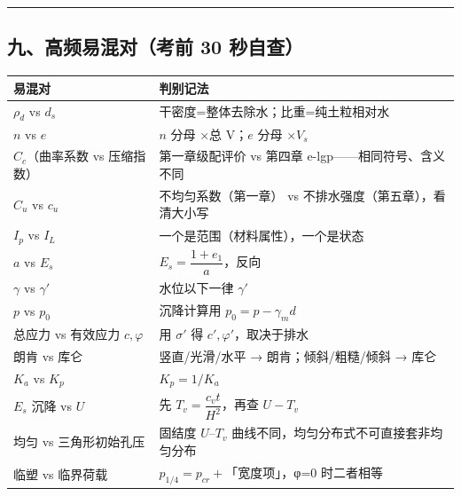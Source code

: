 \documentclass[
]{article}
\newcounter{none} %
\begin{document}
\begin{center}\rule{0.5\linewidth}{0.5pt}\end{center}

\subsection{九、高频易混对（考前 30
秒自查）}\label{ux4e5dux9ad8ux9891ux6613ux6df7ux5bf9ux8003ux524d-30-ux79d2ux81eaux67e5}

{\def\LTcaptype{none} %
\begin{longtable}[]{@{}
  >{\raggedright\arraybackslash}p{}
  >{\raggedright\arraybackslash}p{}@{}}
\toprule\noalign{}
\begin{minipage}[b]{\linewidth}\raggedright
易混对
\end{minipage} & \begin{minipage}[b]{\linewidth}\raggedright
判别记法
\end{minipage} \\
\midrule\noalign{}
\endhead
\bottomrule\noalign{}
\endlastfoot
\(\rho_d\) vs \(d_s\) & 干密度=整体去除水；比重=纯土粒相对水 \\
\(n\) vs \(e\) & \(n\) 分母 ×总 V；\(e\) 分母 ×\(V_s\) \\
\(C_c\)（曲率系数 vs 压缩指数） & 第一章级配评价 vs 第四章
e-lgp------相同符号、含义不同 \\
\(C_u\) vs \(c_u\) & 不均匀系数（第一章） vs
不排水强度（第五章），看清大小写 \\
\(I_p\) vs \(I_L\) & 一个是范围（材料属性），一个是状态 \\
\(a\) vs \(E_s\) & \(E_s=\dfrac{1+e_1}{a}\)，反向 \\
\(\gamma\) vs \(\gamma'\) & 水位以下一律 \(\gamma'\) \\
\(p\) vs \(p_0\) & 沉降计算用 \(p_0=p-\gamma_md\) \\
总应力 vs 有效应力 \(c,\varphi\) & 用 \(\sigma'\) 得
\(c',\varphi'\)，取决于排水 \\
朗肯 vs 库仑 & 竖直/光滑/水平 → 朗肯；倾斜/粗糙/倾斜 → 库仑 \\
\(K_a\) vs \(K_p\) & \(K_p=1/K_a\) \\
\(E_s\) 沉降 vs \(U\) & 先 \(T_v=\dfrac{c_vt}{H^2}\)，再查 \(U-T_v\) \\
均匀 vs 三角形初始孔压 & 固结度 \(U\)--\(T_v\)
曲线不同，均匀分布式不可直接套非均匀分布 \\
临塑 vs 临界荷载 & \(p_{1/4}=p_{cr}+\)「宽度项」，φ=0 时二者相等 \\
\end{longtable}
}
\end{document}

